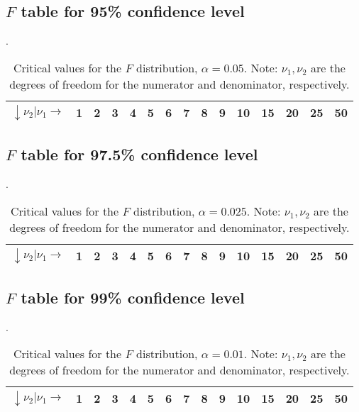 \clearpage
\subsection{$F$ table for 95\% confidence level}.

\begin{table}[h]
\centering
\footnotesize
\begin{tabular}{|c|cccccccccccccc|} \hline
$\downarrow \nu_2 | \nu_1 \rightarrow$ & \bf{1} & \bf{2} & \bf{3} & \bf{4} & \bf{5} & \bf{6} & \bf{7} & \bf{8} & \bf{9} & \bf{10} & \bf{15} & \bf{20} & \bf{25} & \bf{50} \\ \hline

\end{tabular}
\normalsize
\caption{Critical values for the $F$ distribution, $\alpha = 0.05$.  Note: $\nu_1, \nu_2$ are the degrees of freedom for
the numerator and denominator, respectively.}
\label{tbl:Critical_F95}
\end{table}

\clearpage
\subsection{$F$ table for 97.5\% confidence level}.

\begin{table}[h]
\centering
\footnotesize
\begin{tabular}{|c|cccccccccccccc|} \hline
$\downarrow \nu_2 | \nu_1 \rightarrow$ & \bf{1} & \bf{2} & \bf{3} & \bf{4} & \bf{5} & \bf{6} & \bf{7} & \bf{8} & \bf{9} & \bf{10} & \bf{15} & \bf{20} & \bf{25} & \bf{50} \\ \hline

\end{tabular}
\normalsize
\caption{Critical values for the $F$ distribution, $\alpha = 0.025$.  Note: $\nu_1, \nu_2$ are the degrees of freedom for
the numerator and denominator, respectively.}
\label{tbl:Critical_F975}
\end{table}

\clearpage
\subsection{$F$ table for 99\% confidence level}.

\begin{table}[h]
\centering
\footnotesize
\begin{tabular}{|c|cccccccccccccc|} \hline
$\downarrow \nu_2 | \nu_1 \rightarrow$ & \bf{1} & \bf{2} & \bf{3} & \bf{4} & \bf{5} & \bf{6} & \bf{7} & \bf{8} & \bf{9} & \bf{10} & \bf{15} & \bf{20} & \bf{25} & \bf{50} \\ \hline

\end{tabular}
\normalsize
\caption{Critical values for the $F$ distribution, $\alpha = 0.01$.  Note: $\nu_1, \nu_2$ are the degrees of freedom for
the numerator and denominator, respectively.}
\label{tbl:Critical_F99}
\end{table}

